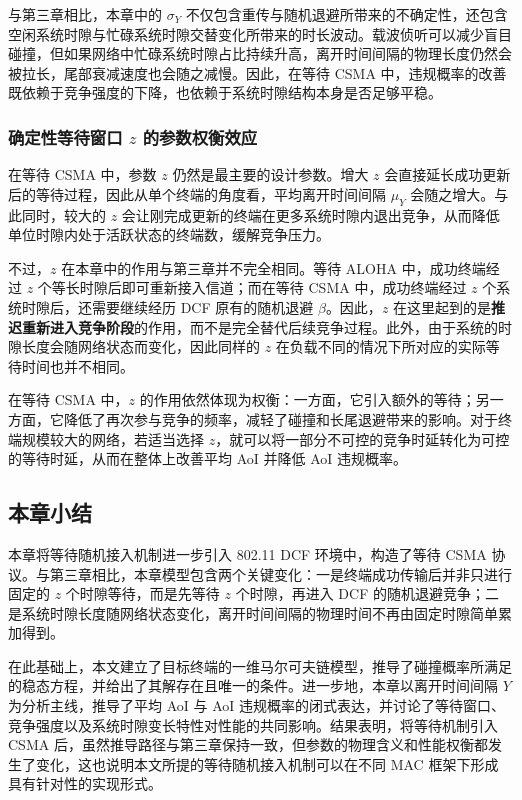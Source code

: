 与第三章相比，本章中的 $\sigma_Y$ 不仅包含重传与随机退避所带来的不确定性，还包含空闲系统时隙与忙碌系统时隙交替变化所带来的时长波动。载波侦听可以减少盲目碰撞，但如果网络中忙碌系统时隙占比持续升高，离开时间间隔的物理长度仍然会被拉长，尾部衰减速度也会随之减慢。因此，在等待 CSMA 中，违规概率的改善既依赖于竞争强度的下降，也依赖于系统时隙结构本身是否足够平稳。

\subsubsection{确定性等待窗口 \texorpdfstring{$z$}{z} 的参数权衡效应}

在等待 CSMA 中，参数 $z$ 仍然是最主要的设计参数。增大 $z$ 会直接延长成功更新后的等待过程，因此从单个终端的角度看，平均离开时间间隔 $\mu_Y$ 会随之增大。与此同时，较大的 $z$ 会让刚完成更新的终端在更多系统时隙内退出竞争，从而降低单位时隙内处于活跃状态的终端数，缓解竞争压力。

不过，$z$ 在本章中的作用与第三章并不完全相同。等待 ALOHA 中，成功终端经过 $z$ 个等长时隙后即可重新接入信道；而在等待 CSMA 中，成功终端经过 $z$ 个系统时隙后，还需要继续经历 DCF 原有的随机退避 $\beta$。因此，$z$ 在这里起到的是\textbf{推迟重新进入竞争阶段}的作用，而不是完全替代后续竞争过程。此外，由于系统的时隙长度会随网络状态而变化，因此同样的 $z$ 在负载不同的情况下所对应的实际等待时间也并不相同。

在等待 CSMA 中，$z$ 的作用依然体现为权衡：一方面，它引入额外的等待；另一方面，它降低了再次参与竞争的频率，减轻了碰撞和长尾退避带来的影响。对于终端规模较大的网络，若适当选择 $z$，就可以将一部分不可控的竞争时延转化为可控的等待时延，从而在整体上改善平均 AoI 并降低 AoI 违规概率。

\subsection{本章小结}

本章将等待随机接入机制进一步引入 802.11 DCF 环境中，构造了等待 CSMA 协议。与第三章相比，本章模型包含两个关键变化：一是终端成功传输后并非只进行固定的 $z$ 个时隙等待，而是先等待 $z$ 个时隙，再进入 DCF 的随机退避竞争；二是系统时隙长度随网络状态变化，离开时间间隔的物理时间不再由固定时隙简单累加得到。

在此基础上，本文建立了目标终端的一维马尔可夫链模型，推导了碰撞概率所满足的稳态方程，并给出了其解存在且唯一的条件。进一步地，本章以离开时间间隔 $Y$ 为分析主线，推导了平均 AoI 与 AoI 违规概率的闭式表达，并讨论了等待窗口、竞争强度以及系统时隙变长特性对性能的共同影响。结果表明，将等待机制引入 CSMA 后，虽然推导路径与第三章保持一致，但参数的物理含义和性能权衡都发生了变化，这也说明本文所提的等待随机接入机制可以在不同 MAC 框架下形成具有针对性的实现形式。
